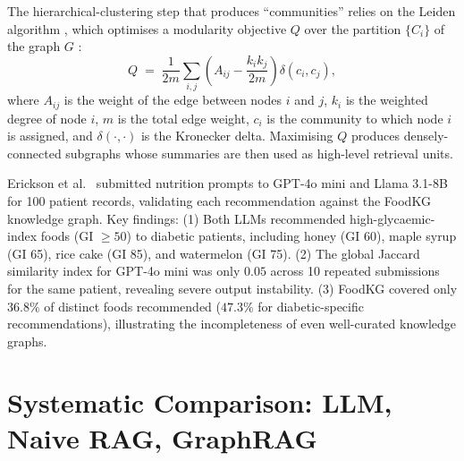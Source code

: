 \documentclass[12pt,a4paper,oneside]{report}
\begin{document}
The hierarchical-clustering step that produces ``communities'' relies
on the Leiden algorithm \citep{traag2019leiden}, which optimises a
modularity objective $Q$ over the partition $\{C_i\}$ of the graph $G$
\citep{edge2024}:
\begin{equation}
    Q \;=\; \frac{1}{2m} \sum_{i,j} \left( A_{ij} - \frac{k_i k_j}{2m} \right) \delta(c_i, c_j),
    \label{eq:modularity}
\end{equation}
where $A_{ij}$ is the weight of the edge between nodes $i$ and $j$,
$k_i$ is the weighted degree of node $i$, $m$ is the total edge
weight, $c_i$ is the community to which node $i$ is assigned, and
$\delta(\cdot,\cdot)$ is the Kronecker delta. Maximising $Q$ produces
densely-connected subgraphs whose summaries are then used as
high-level retrieval units.

\begin{tcolorbox}[colback=orange!5, colframe=orange!70!black, boxrule=0.4pt,
                  title=\textbf{Empirical finding: the ChatBS-NexGen nutrition case study}]
\small
Erickson et al.~\citep{erickson2025} submitted nutrition prompts to GPT-4o mini and
Llama 3.1-8B for 100 patient records, validating each recommendation against
the FoodKG knowledge graph. Key findings:
(1) Both LLMs recommended high-glycaemic-index foods (GI $\geq 50$) to
diabetic patients, including honey (GI 60), maple syrup (GI 65), rice cake
(GI 85), and watermelon (GI 75).
(2) The global Jaccard similarity index for GPT-4o mini was only $0.05$
across 10 repeated submissions for the same patient, revealing severe
output instability.
(3) FoodKG covered only $36.8\%$ of distinct foods recommended
($47.3\%$ for diabetic-specific recommendations), illustrating the
incompleteness of even well-curated knowledge graphs.
\end{tcolorbox}

\section{Systematic Comparison: LLM, Naive RAG, GraphRAG}
\label{sec:lit_comparison}
\end{document}
